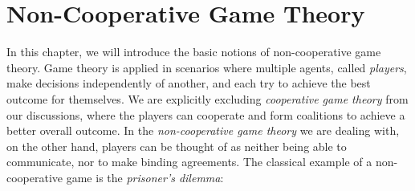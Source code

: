 \documentclass[a4paper]{scrreprt}
\begin{document}
    \chapter{Non-Cooperative Game Theory}
    \label{chap:nonCooperativeRealValuedGameTheory}
    In this chapter, we will introduce the basic notions of non-cooperative game theory.
    Game theory is applied in scenarios where multiple agents, called \emph{players}, make decisions independently of another, and each try to achieve the best outcome for themselves.
    We are explicitly excluding \emph{cooperative game theory} from our discussions, where the players can cooperate and form coalitions to achieve a better overall outcome.
    In the \emph{non-cooperative game theory} we are dealing with, on the other hand, players can be thought of as neither being able to communicate, nor to make binding agreements.
    The classical example of a non-cooperative game is the \emph{prisoner's dilemma}:
\end{document}
